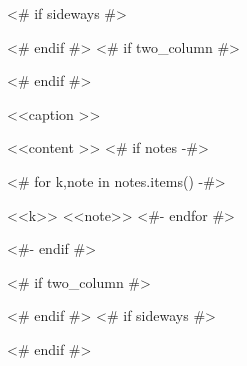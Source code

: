 \begin{<< env  >>}
  \centering
  <# if sideways #>
  \begin{adjustbox}{angle=90}
  <# endif #>
  <# if two_column #>
  \begin{adjustbox}{width=\textwidth}
  <# endif #>
  \begin{threeparttable}
    \caption{<<caption >>}
    \label{tbl:<< id >>}
    <<content >>
    <# if notes -#>
    \begin{tablenotes}
      <# for k,note in notes.items() -#>
      \item[<<k>>] <<note>>
      <#- endfor #>
    \end{tablenotes}
    <#- endif #>
  \end{threeparttable}
  <# if two_column #>
  \end{adjustbox}
  <# endif #>
  <# if sideways #>
  \end{adjustbox}
  <# endif #>
\end{<< env  >>}

